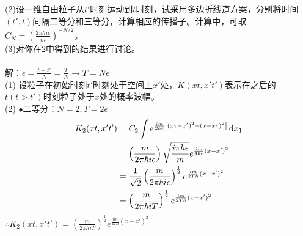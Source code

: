 \documentclass[12pt]{article}
\numberwithin{equation}{section}	 %
\begin{document}
\begin{spacing}{1.5}
{(2)设一维自由粒子从$t'$时刻运动到$t$时刻，试采用多边折线道方案，分别将时间$(t',t)$间隔二等分和三等分，计算相应的传播子。计算中，可取$\displaystyle C_{N}= \left(\frac{2\pi\hbar i\epsilon}{m}\right)^{-N/2}$。\\
(3)对你在2中得到的结果进行讨论。}\\
~\\
解：$\displaystyle \epsilon = \frac{t-t'}{N} = \frac{T}{N} \rightarrow T=N\epsilon$\\
(1) \quad 设粒子在初始时刻$t'$时刻处于空间上$x'$处，$K(xt,x't')$表示在之后的$t(t>t')$时刻粒子处于$x$处的概率波幅。\\
(2) \quad $\bullet$二等分：$N=2,T=2\epsilon$
\begin{equation}
\begin{aligned}
K_{2}(xt,x't') &= C_{2} \int e^{\frac{im}{2\hbar \epsilon}\left[(x_{1}-x')^{2} + (x-x_{1})^{2}\right]}\mathop{}\!\mathrm{d} x_{1} \\
&= \left(\frac{m}{2\pi\hbar i\epsilon}\right) \sqrt{\frac{i\pi\hbar\epsilon}{m}} e^{\frac{im}{4\hbar \epsilon}(x-x')^{2}} \\
&= \frac{1}{\sqrt{2}} \left(\frac{m}{2\pi\hbar i\epsilon}\right)^{\frac{1}{2}} e^{\frac{im}{2T\hbar}(x-x')^{2}} \\
&= \left(\frac{m}{2\pi\hbar iT}\right)^{\frac{1}{2}} e^{\frac{im}{2T\hbar}(x-x')^{2}}
\end{aligned}
\end{equation}
$\therefore \displaystyle K_{2}(xt,x't') = \left(\frac{m}{2\pi\hbar iT}\right)^{\frac{1}{2}} e^{\frac{im}{2T\hbar}(x-x')^{2}}$\\


\end{spacing}
\end{document}
